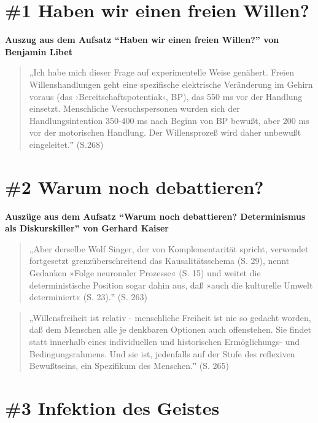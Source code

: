 \documentclass[
  a4paper,
]{report}
\begin{document}
\hypertarget{def-ev1}{%
\section{\#1 Haben wir einen freien Willen?}\label{def-ev1}}

\textbf{Auszug aus dem Aufsatz ``Haben wir einen freien Willen?'' von Benjamin Libet \citeyearpar{Libet2004}}

\begin{quote}
„Ich habe mich dieser Frage auf experimentelle Weise genähert. Freien Willenshandlungen geht eine spezifische elektrische Veränderung im Gehirn voraus (das ›Bereitschaftspotentiak‹, BP), das 550 ms vor der Handlung einsetzt. Menschliche Versuchspersonen wurden sich der Handlungsintention 350-400 ms nach Beginn von BP bewußt, aber 200 ms vor der motorischen Handlung. Der Willensprozeß wird daher unbewußt eingeleitet.‟ (S.268)
\end{quote}

\hypertarget{def-ev2}{%
\section{\#2 Warum noch debattieren?}\label{def-ev2}}

\textbf{Auszüge aus dem Aufsatz ``Warum noch debattieren? Determinismus als Diskurskiller'' von Gerhard Kaiser \citeyearpar{Kaiser2004}}

\begin{quote}
„Aber derselbe Wolf Singer, der von Komplementarität spricht, verwendet fortgesetzt grenzüberschreitend das Kausalitätsschema (S. 29), nennt Gedanken »Folge neuronaler Prozesse« (S. 15) und weitet die deterministische Position sogar dahin aus, daß »auch die kulturelle Umwelt determiniert« (S. 23).‟ (S. 263)
\end{quote}

\begin{quote}
„Willensfreiheit ist relativ - menschliche Freiheit ist nie so gedacht worden, daß dem Menschen alle je denkbaren Optionen auch offenstehen. Sie findet statt innerhalb eines individuellen und historischen Ermöglichungs- und Bedingungsrahmens. Und sie ist, jedenfalls auf der Stufe des reflexiven Bewußtseins, ein Spezifikum des Menschen.‟ (S. 265)
\end{quote}

\hypertarget{def-ev3}{%
\section{\#3 Infektion des Geistes}\label{def-ev3}}
\end{document}
